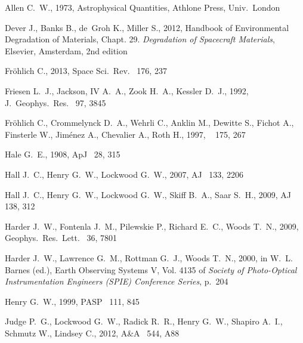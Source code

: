 \documentclass[useAMS,usenatbib]{mn2e}
\newcommand{\highlight}{\color{red} }
\renewcommand{\highlight}{}
\begin{document}
\begin{thebibliography}{}

Allen C.~W., 1973,
\newblock Astrophysical Quantities,
\newblock Athlone Press, Univ.\ London

{\highlight

Dever J., Banks B., de~Groh K., Miller S., 2012,
\newblock Handbook of Environmental Degradation of Materials, Chapt. 29. {\em
  Degradation of Spacecraft Materials},
\newblock Elsevier, Amsterdam, 2nd edition

{Fr{\"o}hlich} C., 2013, Space Sci.\ Rev.~  176, 237
}
{Friesen} L.~J., {Jackson}, IV A.~A., {Zook} H.~A., {Kessler} D.~J., 1992, J.\
  Geophys.\ Res.~  97, 3845

{Fr{\"o}hlich} C., {Crommelynck} D.~A., {Wehrli} C., {Anklin} M., {Dewitte} S.,
  {Fichot} A., {Finsterle} W., {Jim{\'e}nez} A., {Chevalier} A., {Roth} H.,
  1997, ~  175, 267

{Hale} G.~E., 1908, ApJ~  28, 315

{Hall} J.~C., {Henry} G.~W., {Lockwood} G.~W., 2007, AJ~  133, 2206

{Hall} J.~C., {Henry} G.~W., {Lockwood} G.~W., {Skiff} B.~A., {Saar} S.~H.,
  2009, AJ~  138, 312

{Harder} J.~W., {Fontenla} J.~M., {Pilewskie} P., {Richard} E.~C., {Woods}
  T.~N., 2009, Geophys.\ Res.\ Lett.~  36, 7801

{Harder} J.~W., {Lawrence} G.~M., {Rottman} G.~J., {Woods} T.~N., 2000,
\newblock in W.~L. {Barnes} (ed.), Earth Observing Systems V, Vol. 4135 of {\em
  Society of Photo-Optical Instrumentation Engineers (SPIE) Conference
  Series\/}, p.~204

{Henry} G.~W., 1999, PASP~  111, 845

{Judge} P.~G., {Lockwood} G.~W., {Radick} R.~R., {Henry} G.~W., {Shapiro}
  A.~I., {Schmutz} W., {Lindsey} C., 2012, A\&A~  544, A88


\end{thebibliography}
\end{document}
